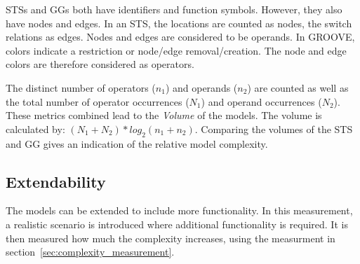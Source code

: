 STSs and GGs both have identifiers and function symbols. However, they also have nodes and edges. In an STS, the locations are counted as nodes, the switch relations as edges. Nodes and edges are considered to be operands. In GROOVE, colors indicate a restriction or node/edge removal/creation. The node and edge colors are therefore considered as operators.

The distinct number of operators ($n_1$) and operands ($n_2$) are counted as well as the total number of operator occurrences ($N_1$) and operand occurrences ($N_2$). These metrics combined lead to the \textit{Volume} of the models. The volume is calculated by: $(N_1+N_2)*\mathit{log}_2(n_1+n_2)$. Comparing the volumes of the STS and GG gives an indication of the relative model complexity.

\subsection{Extendability}
The models can be extended to include more functionality. In this measurement, a realistic scenario is introduced where additional functionality is required. It is then measured how much the complexity increases, using the measurment in section~\ref{sec:complexity_measurement}.
